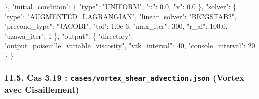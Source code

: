 \documentclass[
  french,
]{article}
\newenvironment{Shaded}{}{}
\newcommand{\DataTypeTok}[1]{\textcolor[rgb]{0.56,0.13,0.00}{#1}}
\newcommand{\DecValTok}[1]{\textcolor[rgb]{0.25,0.63,0.44}{#1}}
\newcommand{\FloatTok}[1]{\textcolor[rgb]{0.25,0.63,0.44}{#1}}
\newcommand{\FunctionTok}[1]{\textcolor[rgb]{0.02,0.16,0.49}{#1}}
\newcommand{\StringTok}[1]{\textcolor[rgb]{0.25,0.44,0.63}{#1}}
\begin{document}
\begin{Shaded}
\begin{Highlighting}[]
  \FunctionTok{\},}
  \DataTypeTok{"initial\_condition"}\FunctionTok{:} \FunctionTok{\{} \DataTypeTok{"type"}\FunctionTok{:} \StringTok{"UNIFORM"}\FunctionTok{,} \DataTypeTok{"u"}\FunctionTok{:} \FloatTok{0.0}\FunctionTok{,} \DataTypeTok{"v"}\FunctionTok{:} \FloatTok{0.0} \FunctionTok{\},}
  \DataTypeTok{"solver"}\FunctionTok{:} \FunctionTok{\{}
    \DataTypeTok{"type"}\FunctionTok{:} \StringTok{"AUGMENTED\_LAGRANGIAN"}\FunctionTok{,}
    \DataTypeTok{"linear\_solver"}\FunctionTok{:} \StringTok{"BICGSTAB2"}\FunctionTok{,}
    \DataTypeTok{"precond\_type"}\FunctionTok{:} \StringTok{"JACOBI"}\FunctionTok{,}
    \DataTypeTok{"tol"}\FunctionTok{:} \FloatTok{1.0e{-}6}\FunctionTok{,} \DataTypeTok{"max\_iter"}\FunctionTok{:} \DecValTok{300}\FunctionTok{,} \DataTypeTok{"r\_al"}\FunctionTok{:} \FloatTok{100.0}\FunctionTok{,} \DataTypeTok{"uzawa\_iter"}\FunctionTok{:} \DecValTok{1}
  \FunctionTok{\},}
  \DataTypeTok{"output"}\FunctionTok{:} \FunctionTok{\{} \DataTypeTok{"directory"}\FunctionTok{:} \StringTok{"output\_poiseuille\_variable\_viscosity"}\FunctionTok{,} \DataTypeTok{"vtk\_interval"}\FunctionTok{:} \DecValTok{40}\FunctionTok{,} \DataTypeTok{"console\_interval"}\FunctionTok{:} \DecValTok{20} \FunctionTok{\}}
\FunctionTok{\}}
\end{Highlighting}
\end{Shaded}

\subsubsection{\texorpdfstring{11.5. Cas 3.19 :
\texttt{cases/vortex\_shear\_advection.json} (Vortex avec
Cisaillement)}{11.5. Cas 3.19 : cases/vortex\_shear\_advection.json (Vortex avec Cisaillement)}}\label{cas-3.19-casesvortex_shear_advection.json-vortex-avec-cisaillement}
\end{document}
